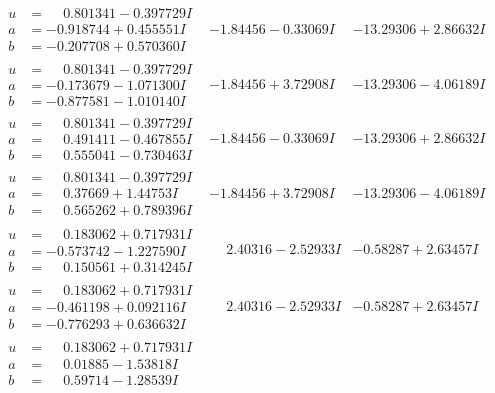 \documentclass[1p]{elsarticle_modified}
\theoremstyle{definition}
\begin{document}
$$\begin{array}{c|c|c}
\begin{aligned}
u &= \phantom{-}0.801341 - 0.397729 I \\
a &= -0.918744 + 0.455551 I \\
b &= -0.207708 + 0.570360 I\end{aligned}
 & -1.84456 - 0.33069 I & -13.29306 + 2.86632 I \\ \hline\begin{aligned}
u &= \phantom{-}0.801341 - 0.397729 I \\
a &= -0.173679 - 1.071300 I \\
b &= -0.877581 - 1.010140 I\end{aligned}
 & -1.84456 + 3.72908 I & -13.29306 - 4.06189 I \\ \hline\begin{aligned}
u &= \phantom{-}0.801341 - 0.397729 I \\
a &= \phantom{-}0.491411 - 0.467855 I \\
b &= \phantom{-}0.555041 - 0.730463 I\end{aligned}
 & -1.84456 - 0.33069 I & -13.29306 + 2.86632 I \\ \hline\begin{aligned}
u &= \phantom{-}0.801341 - 0.397729 I \\
a &= \phantom{-}0.37669 + 1.44753 I \\
b &= \phantom{-}0.565262 + 0.789396 I\end{aligned}
 & -1.84456 + 3.72908 I & -13.29306 - 4.06189 I \\ \hline\begin{aligned}
u &= \phantom{-}0.183062 + 0.717931 I \\
a &= -0.573742 - 1.227590 I \\
b &= \phantom{-}0.150561 + 0.314245 I\end{aligned}
 & \phantom{-}2.40316 - 2.52933 I & -0.58287 + 2.63457 I \\ \hline\begin{aligned}
u &= \phantom{-}0.183062 + 0.717931 I \\
a &= -0.461198 + 0.092116 I \\
b &= -0.776293 + 0.636632 I\end{aligned}
 & \phantom{-}2.40316 - 2.52933 I & -0.58287 + 2.63457 I \\ \hline\begin{aligned}
u &= \phantom{-}0.183062 + 0.717931 I \\
a &= \phantom{-}0.01885 - 1.53818 I \\
b &= \phantom{-}0.59714 - 1.28539 I\end{aligned}

\end{array}$$
\end{document}
